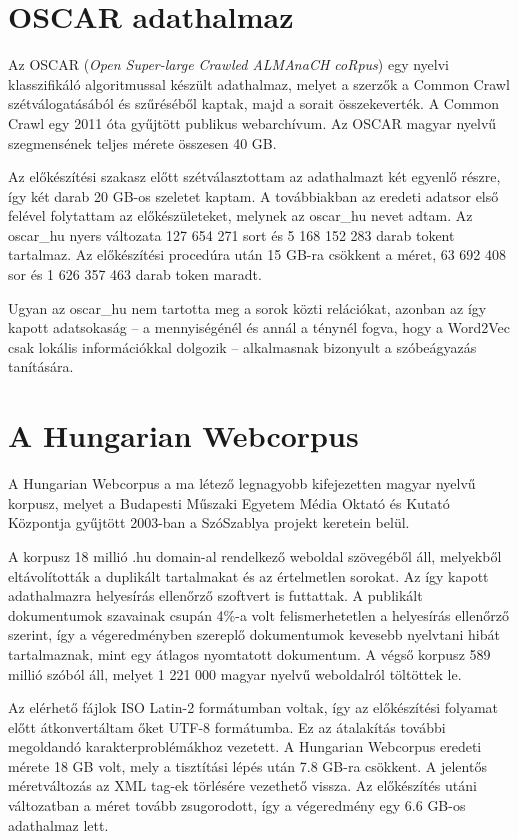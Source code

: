 \section{OSCAR adathalmaz}

Az OSCAR (\textit{Open Super-large Crawled ALMAnaCH coRpus}) \cite{oscar} egy nyelvi klasszifikáló algoritmussal készült adathalmaz, melyet a szerzők a Common Crawl \cite{common} szétválogatásából és szűréséből kaptak, majd a sorait összekeverték. A Common Crawl egy 2011 óta gyűjtött publikus webarchívum. Az OSCAR magyar nyelvű szegmensének teljes mérete összesen 40 GB. 

Az előkészítési szakasz előtt szétválasztottam az adathalmazt két egyenlő részre, így két darab 20 GB-os szeletet kaptam. A továbbiakban az eredeti adatsor első felével folytattam az előkészületeket, melynek az oscar\_hu nevet adtam.
Az oscar\_hu nyers változata 127 654 271 sort és 5 168 152 283 darab tokent tartalmaz. Az előkészítési procedúra után 15 GB-ra csökkent a méret, 63 692 408 sor és 1 626 357 463 darab token maradt.

Ugyan az oscar\_hu nem tartotta meg a sorok közti relációkat, azonban az így kapott adatsokaság – a mennyiségénél és annál a ténynél fogva, hogy a Word2Vec csak lokális információkkal dolgozik – alkalmasnak bizonyult a szóbeágyazás tanítására.

\section{A Hungarian Webcorpus}

A Hungarian Webcorpus \cite{hungarian_webcorpus} a ma létező legnagyobb kifejezetten magyar nyelvű korpusz, melyet a Budapesti Műszaki Egyetem Média Oktató és Kutató Központja gyűjtött 2003-ban a SzóSzablya projekt keretein belül.

A korpusz 18 millió .hu domain-al rendelkező weboldal szövegéből áll, melyekből eltávolították a duplikált tartalmakat és az értelmetlen sorokat. Az így kapott adathalmazra helyesírás ellenőrző szoftvert is futtattak. A publikált dokumentumok szavainak csupán 4\%-a volt felismerhetetlen a helyesírás ellenőrző szerint, így a végeredményben szereplő dokumentumok kevesebb nyelvtani hibát tartalmaznak, mint egy átlagos nyomtatott dokumentum. A végső korpusz 589 millió szóból áll, melyet 1 221 000 magyar nyelvű weboldalról töltöttek le.

Az elérhető fájlok ISO Latin-2 formátumban voltak, így az előkészítési folyamat előtt átkonvertáltam őket UTF-8 formátumba. Ez az átalakítás további megoldandó karakterproblémákhoz vezetett. A Hungarian Webcorpus eredeti mérete 18 GB volt, mely a tisztítási lépés után 7.8 GB-ra csökkent. A jelentős méretváltozás az XML tag-ek törlésére vezethető vissza. Az előkészítés utáni változatban a méret tovább zsugorodott, így a végeredmény egy 6.6 GB-os adathalmaz lett.

